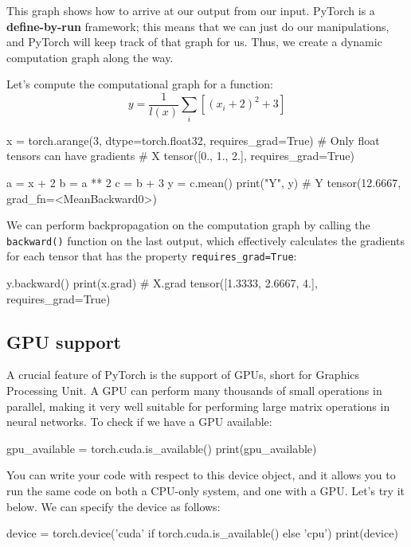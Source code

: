 This graph shows how to arrive at our output from our input. PyTorch is a \textbf{define-by-run}
framework; this means that we can just do our manipulations, and PyTorch will keep track of that
graph for us. Thus, we create a dynamic computation graph along the way.

Let's compute the computational graph for a function:
\[ 
y = \frac{1}{l(x)}\sum_{i}^{}[(x_i + 2)^2 + 3]
\]

\begin{codeblock}[language=python]
    x = torch.arange(3, dtype=torch.float32, requires_grad=True)
    # Only float tensors can have gradients
    # X tensor([0., 1., 2.], requires_grad=True)

    a = x + 2
    b = a ** 2
    c = b + 3
    y = c.mean()
    print("Y", y)
    # Y tensor(12.6667, grad_fn=<MeanBackward0>)
\end{codeblock}

We can perform backpropagation on the computation graph by calling the \texttt{backward()} function on the last output, which effectively calculates the gradients for each tensor that has the property
\texttt{requires\_grad=True}:

\begin{codeblock}[language=python]
    y.backward()
    print(x.grad)
    # X.grad tensor([1.3333, 2.6667, 4.], requires_grad=True)
\end{codeblock}

\subsection*{GPU support}

A crucial feature of PyTorch is the support of GPUs, short for Graphics Processing Unit. A GPU
can perform many thousands of small operations in parallel, making it very well suitable for
performing large matrix operations in neural networks.
To check if we have a GPU available:

\begin{codeblock}[language=python]
    gpu_available = torch.cuda.is_available()
    print(gpu_available)
\end{codeblock}

You can write your code with respect to this device object, and it allows you to run the same code
on both a CPU-only system, and one with a GPU. Let’s try it below. We can specify the device as
follows:

\begin{codeblock}[language=python]
    device = torch.device('cuda' if torch.cuda.is_available() else 'cpu')
    print(device)
\end{codeblock}

